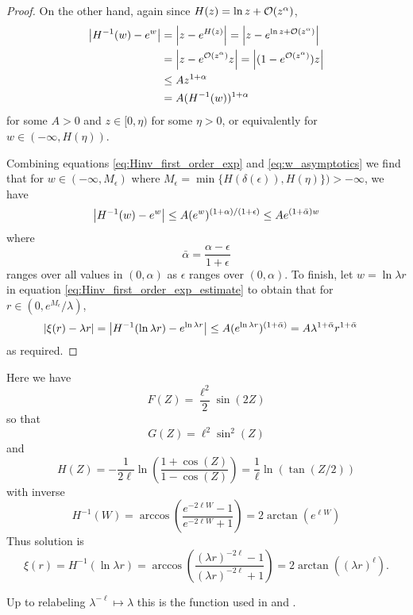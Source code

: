 \documentclass{amsart}
\begin{document}
\begin{proof}
On the other hand, again since \(H(z) = \ln z + \operatorname{\mathcal{O}}(z^{\alpha})\),
\begin{equation}
\label{eq:w_asymptotics}
\begin{split}
\left|{H^{-1}(w) - e^w}\right| &= \left|{z - e^{H(z)}}\right| = \left|{z - e^{\ln z + \operatorname{\mathcal{O}}(z^{\alpha})}}\right| \\
&= \left|{z - e^{\operatorname{\mathcal{O}}(z^{\alpha})} z}\right| = \left|{(1 - e^{\operatorname{\mathcal{O}}(z^{\alpha})})z}\right| \\
&\leq A z^{1+\alpha} \\
&= A (H^{-1}(w))^{1+\alpha}
\end{split}
\end{equation}
for some \(A > 0\) and \(z \in [0, \eta)\) for some \(\eta > 0\), or equivalently for \(w \in (-\infty, H(\eta))\).

Combining equations \eqref{eq:Hinv_first_order_exp} and \eqref{eq:w_asymptotics} we find that for \(w \in (-\infty, M_{\epsilon})\) where \(M_{\epsilon} = \min\{H(\delta(\epsilon)), H(\eta)\}) > - \infty\), we have
\begin{equation}
\label{eq:Hinv_first_order_exp_estimate}
\left|{H^{-1}(w) - e^w}\right| \leq A (e^w)^{(1+\alpha)/(1+\epsilon)} \leq A e^{(1+\bar{\alpha}) w}
\end{equation}
where
\[
\bar{\alpha} = \frac{\alpha - \epsilon}{1 + \epsilon}
\]
ranges over all values in \((0, \alpha)\) as \(\epsilon\) ranges over \((0, \alpha)\). To finish, let \(w = \ln \lambda r\) in equation \eqref{eq:Hinv_first_order_exp_estimate} to obtain that for \(r \in (0, e^{M_{\epsilon}}/\lambda)\),
\[
\begin{split}
\left|{\xi(r) - \lambda r}\right| &= \left|{H^{-1} (\ln \lambda r) - e^{\ln \lambda r}}\right| \leq A (e^{\ln \lambda r})^{(1 + \bar{\alpha})} = A\lambda^{1+\bar{\alpha}} r^{1+\bar{\alpha}}
\end{split}
\]
as required.
\end{proof}

\begin{example}

Here we have
\[
F(Z) = \frac{\ell^2}{2} \sin(2Z)
\]
so that
\[
G(Z) = \ell^2 \sin^2(Z)
\]
and
\[
H(Z) = -\frac{1}{2\ell} \ln \left(\frac{1+\cos(Z)}{1-\cos(Z)}\right) = \frac{1}{\ell}\ln \left(\tan(Z/2)\right)
\]
with inverse
\[
H^{-1}(W) = \arccos\left(\frac{e^{-2\ell W} - 1}{e^{-2\ell W} + 1}\right) = 2 \arctan(e^{\ell W})
\]
Thus solution is
\[
\xi(r) = H^{-1} (\ln \lambda r) = \arccos\left(\frac{(\lambda r)^{-2\ell} - 1}{(\lambda r)^{-2\ell} + 1}\right) = 2\arctan((\lambda r)^{\ell}).
\]

Up to relabeling \(\lambda^{-\ell} \mapsto \lambda\) this is the function used in \cite{MR1180392} and \cite{MR2332425}.
\end{example}
\end{document}
